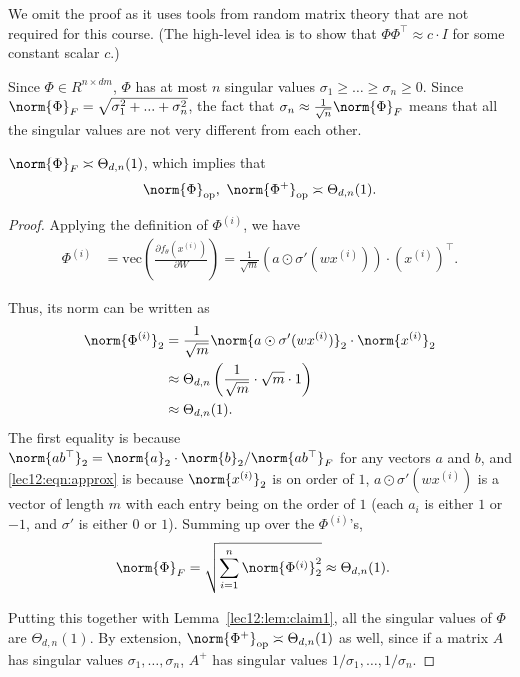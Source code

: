 We omit the proof as it uses tools from random matrix theory that are not required for this course. (The high-level idea is to show that $\Phi \Phi^\top \approx c \cdot I$ for some constant scalar $c$.)

\begin{remark}
Since $\Phi \in R^{n \times dm}$, $\Phi$ has at most $n$ singular values $\sigma_1 \geq \ldots \geq \sigma_n \geq 0$. Since $\norm{\Phi}_F = \sqrt{\sigma_1^2 + ... + \sigma_n^2}$, the fact that $\sigma_n \approx \frac{1}{\sqrt{n}} \norm{\Phi}_F$ means that all the singular values are not very different from each other.
\end{remark}

\begin{lemma}\label{lec12:lem:phi-norm}
$\norm{\Phi}_F \asymp \Theta_{d,n}(1)$, which implies that
\begin{equation}
\norm{\Phi}_{\text{op}}, \ \norm{\Phi^+}_{\text{op}}  \asymp \Theta_{d,n}(1).
\end{equation}
\end{lemma}

\begin{proof}
Applying the definition of $\Phi^{(i)}$, we have 
\begin{align}
    \Phi^{(i)} &= \text{vec}\left(\frac{\partial f_{\theta}(x^{(i)})}{\partial W}\right) = \frac{1}{\sqrt{m}} (a \odot \sigma' (w x^{(i)})) \cdot \left(x^{(i)}\right)^\top.
\end{align}

Thus, its norm can be written as
\begin{align}
\norm{\Phi^{(i)}}_2 &= \frac{1}{\sqrt{m}} \norm{a \odot \sigma' (w x^{(i)})}_2 \cdot \norm{x^{(i)}}_2  \\
&\approx \Theta_{d,n}\left(\frac{1}{\sqrt{m}} \cdot \sqrt{m} \cdot 1 \right) \label{lec12:eqn:approx} \\
&\approx \Theta_{d,n}(1).
\end{align}
The first equality is because $\norm{ab^\top}_2 = \norm{a}_2 \cdot \norm{b}_2 / \norm{ab^\top}_F$ for any vectors $a$ and $b$, and \eqref{lec12:eqn:approx} is because $\norm{x^{(i)}}_2$ is on order of $1$, $a \odot \sigma' (w x^{(i)})$ is a vector of length $m$ with each entry being on the order of $1$ (each $a_i$ is either $1$ or $-1$, and $\sigma'$ is either $0$ or $1$). Summing up over the $\Phi^{(i)}$'s,
\begin{align}
\norm{\Phi}_F &= \sqrt{\sum_{i=1}^n \norm{\Phi^{(i)}}_2^2} \approx \Theta_{d,n}(1).
\end{align}

Putting this together with Lemma~\ref{lec12:lem:claim1}, all the singular values of $\Phi$ are $\Theta_{d,n}(1)$. By extension,  $\norm{\Phi^+}_{\text{op}} \asymp \Theta_{d,n}(1)$ as well, since if a matrix $A$ has singular values $\sigma_1, \dots,\sigma_n$, $A^+$ has singular values $1 / \sigma_1, \dots,1/\sigma_n$. 
\end{proof}


